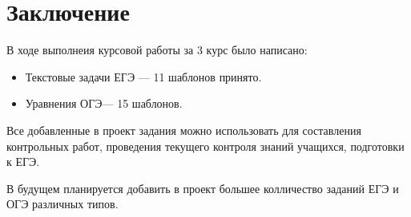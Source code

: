 \section*{Заключение}
В ходе выполнеия курсовой работы за 3 курс было написано:
		      \begin{itemize}
			      \item Текстовые задачи ЕГЭ — 11 шаблонов принято.
			      \item Уравнения ОГЭ— 15 шаблонов.
		      \end{itemize}

Все добавленные в проект задания можно использовать для составления контрольных работ, проведения текущего контроля знаний учащихся, подготовки к ЕГЭ.~\cite{chas-ege}

В будущем планируется добавить в проект большее колличество заданий ЕГЭ и ОГЭ различных типов.


